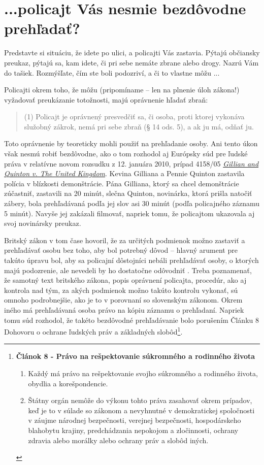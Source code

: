 \documentclass[openany]{book}
\begin{document}
\section*{...policajt Vás nesmie bezdôvodne prehľadať?}

Predstavte si situáciu, že idete po ulici, a policajti Vás zastavia. Pýtajú občiansky preukaz, pýtajú sa, kam idete, či pri sebe nemáte zbrane alebo drogy. Nazrú Vám do tašiek. Rozmýšľate, čím ste boli podozriví, a či to vlastne môžu ...

Policajti okrem toho, že môžu (pripomíname -- len na plnenie úloh zákona!) vyžadovať preukázanie totožnosti, majú oprávnenie hľadať zbraň:

\begin{quote}
(1) Policajt je oprávnený presvedčiť sa, či osoba, proti ktorej vykonáva služobný zákrok, nemá pri sebe zbraň (§ 14 ods. 5), a ak ju má, odňať ju.
\end{quote}

Toto oprávnenie by teoreticky mohli použiť na prehľadanie osoby. Ani tento úkon však nesmú robiť bezdôvodne, ako o tom rozhodol aj Európsky súd pre ľudské práva v relatívne novom rozsudku z 12. januára 2010, prípad 4158/05 \emph{\href{http://cmiskp.echr.coe.int/tkp197/view.asp?action=html&documentId=860909&portal=hbkm&source=externalbydocnumber}{Gillian and Quinton v. The United Kingdom}}. Kevina Gilliana a Pennie Quinton zastavila polícia v blízkosti demonštrácie. Pána Gilliana, ktorý sa chcel demonštrácie zúčastniť, zastavili na 20 minút, slečna Quinton, novinárka, ktorá prišla natočiť zábery, bola prehľadávaná podľa jej slov asi 30 minút (podľa policajného záznamu 5 minút). Navyše jej zakázali filmovať, napriek tomu, že policajtom ukazovala aj svoj novinársky preukaz. 

Britský zákon v tom čase hovoril, že za určitých podmienok možno zastaviť a prehľadávať osobu bez toho, aby bol potrebný dôvod -- hlavný arument pre takúto úpravu bol, aby sa policajní dôstojníci nebáli prehľadávať osoby, o ktorých majú podozrenie, ale nevedeli by ho dostatočne odôvodniť . Treba poznamenať, že samotný text britského zákona, popis oprávnení policajta, procedúr, ako aj kontrola nad tým, za akých podmienok možno takúto kontrolu vykonať, sú omnoho podrobnejšie, ako je to v porovnaní so slovenským zákonom. Okrem iného má prehľadávaná osoba právo na kópiu záznamu o prehľadaní. Napriek tomu súd rozhodol, že takéto bezdôvodné prehľadávanie bolo porušením Článku 8 Dohovoru o ochrane ľudských práv a základných slobôd\footnote{
\textbf{Článok 8 - Právo na rešpektovanie súkromného a rodinného života}
\begin{enumerate}
\item Každý má právo na rešpektovanie svojho súkromného a rodinného života, obydlia a korešpondencie.
\item Štátny orgán nemôže do výkonu tohto práva zasahovať okrem prípadov, keď je to v súlade so zákonom a nevyhnutné v demokratickej spoločnosti v záujme národnej bezpečnosti, verejnej bezpečnosti, hospodárskeho blahobytu krajiny, predchádzania nepokojom a zločinnosti, ochrany zdravia alebo morálky alebo ochrany práv a slobôd iných. 
\end{enumerate}
}. 
\end{document}
